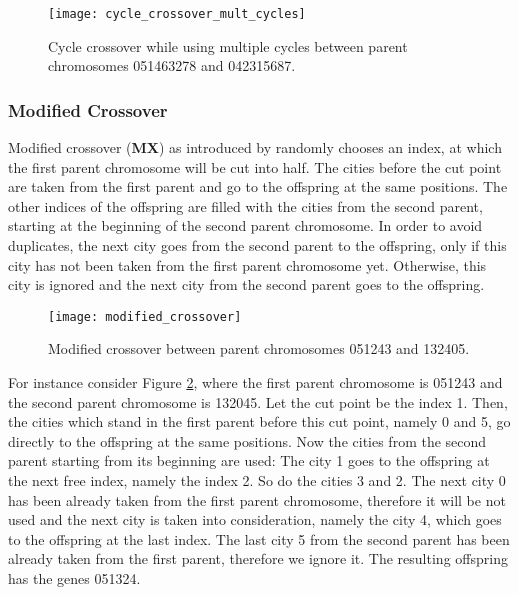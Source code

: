 \begin{figure}[htp] \centering
	\centering
	\texttt{[image: cycle\_crossover\_mult\_cycles]}
	\caption{Cycle crossover while using multiple cycles between parent chromosomes 051463278 and 042315687.}
	\label{cycle_crossover_mult_cycles}
\end{figure}

\subsubsection{Modified Crossover}
\label{subsubsec:modified}
Modified crossover (\textbf{MX}) as introduced by \citeauthor{davis1985applying} \cite{davis1985applying} randomly chooses an index, at which the first parent chromosome will be cut into half. 
The cities before the cut point are taken from the first parent and go to the offspring at the same positions. The other indices of the offspring are filled with the cities from the second parent, starting at the beginning of the second parent chromosome. In order to avoid duplicates, the next city goes from the second parent to the offspring, only if this city has not been taken from the first parent chromosome yet. Otherwise, this city is ignored and the next city from the second parent goes to the offspring.\par

\begin{figure}[htp] \centering
	\centering
	\texttt{[image: modified\_crossover]}
	\caption{Modified crossover between parent chromosomes 051243 and 132405.}
	\label{modified_crossover}
\end{figure}

For instance consider Figure \ref{modified_crossover}, where the first parent chromosome is 051243 and the second parent chromosome is 132045. Let the cut point be the index 1. Then, the cities which stand in the first parent before this cut point, namely 0 and 5, go directly to the offspring at the same positions. Now the cities from the second parent starting from its beginning are used: The city 1 goes to the offspring at the next free index, namely the index 2. So do the cities 3 and 2. The next city 0 has been already taken from the first parent chromosome, therefore it will be not used and the next city is taken into consideration, namely the city 4, which goes to the offspring at the last index. The last city 5 from the second parent has been already taken from the first parent, therefore we ignore it. The resulting offspring has the genes 051324.

